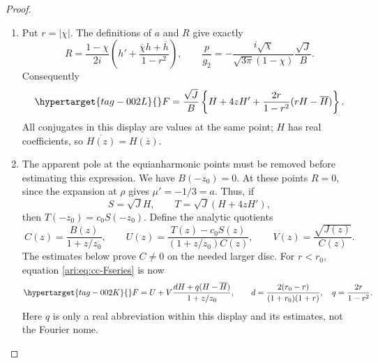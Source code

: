 \begin{proof}
\begin{enumerate}[label=\arabic*.,leftmargin=*]
\item Put $r=|\chi|$. The definitions of $a$ and $R$ give exactly
\[
 R=\frac{1-\chi}{2i}
       \left(h'+\frac{\overline \chi h+\overline h}{1-r^2}\right),
 \qquad
 \frac p{g_2}=-\frac{i\sqrt \chi}{\sqrt{3\pi}(1-\chi)}
                         \frac{\sqrt J}{B}.
\]
Consequently
\begin{equation}\hypertarget{tag-002L}{}\label{ari:eq:cc-Fseries}
 F=\frac{\sqrt J}{B}
 \left\{H+4zH'+\frac{2r}{1-r^2}(rH-\overline H)\right\}.
\end{equation}
All conjugates in this display are values at the same point;
$H$ has real coefficients, so $\overline{H(z)}=H(\overline z)$.

\item The apparent pole at the equianharmonic points must be removed
before estimating this expression. We have $B(-z_0)=0$.
At these points $R=0$, since the expansion at $\rho$ gives
$\mu'=-1/3=a$. Thus, if
\[
 S=\sqrt J H,\qquad T=\sqrt J(H+4zH'),
\]
then $T(-z_0)=c_0S(-z_0)$. Define the analytic quotients
\[
 C(z)=\frac{B(z)}{1+z/z_0},\qquad
 U(z)=\frac{T(z)-c_0S(z)}{(1+z/z_0)C(z)},\qquad
 V(z)=\frac{\sqrt{J(z)}}{C(z)}.
\]
The estimates below prove $C\ne0$ on the needed larger disc.
For $r<r_0$, equation \eqref{ari:eq:cc-Fseries} is now
\begin{equation}\hypertarget{tag-002K}{}\label{ari:eq:cc-Ffactored}
 F=U+V\frac{dH+q(H-\overline H)}{1+z/z_0},
 \qquad
 d=\frac{2(r_0-r)}{(1+r_0)(1+r)},\quad q=\frac{2r}{1-r^2}.
\end{equation}
Here $q$ is only a real abbreviation within this display and
its estimates, not the Fourier nome.


\end{enumerate}
\end{proof}
